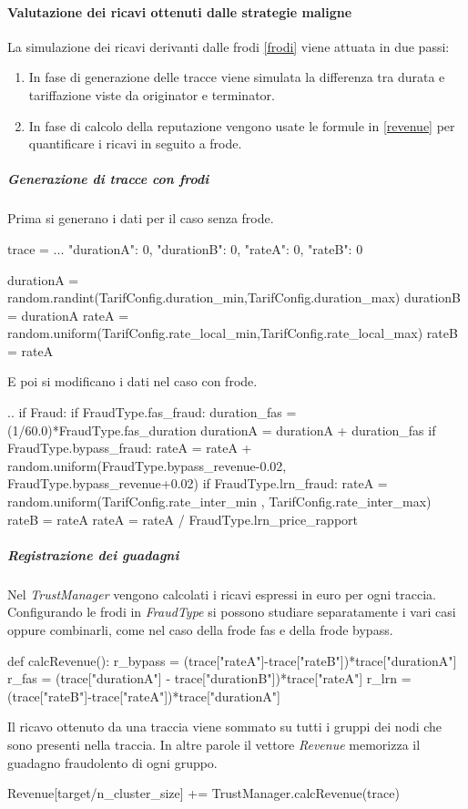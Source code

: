 \paragraph{Valutazione dei ricavi ottenuti dalle strategie maligne}

La simulazione dei ricavi derivanti dalle frodi \ref{frodi} viene attuata in due passi:
\begin{enumerate}
\item In fase di generazione delle tracce viene simulata la differenza tra durata e tariffazione viste da originator e terminator.
\item In fase di calcolo della reputazione vengono usate le formule in \ref{revenue} per quantificare i ricavi in seguito a frode.
\end{enumerate}
\subparagraph{Generazione di tracce con frodi}
Prima si generano i dati per  il caso senza frode.
\begin{python}
trace = {
	...
	"durationA": 0,
	"durationB": 0,
	"rateA": 0,
	"rateB": 0
}

durationA = random.randint(TarifConfig.duration_min,TarifConfig.duration_max)
durationB = durationA
rateA = random.uniform(TarifConfig.rate_local_min,TarifConfig.rate_local_max)
rateB = rateA
\end{python}

E poi si modificano i dati nel caso con frode. 
\begin{python}
..
if Fraud:
	if FraudType.fas_fraud:
		duration_fas = (1/60.0)*FraudType.fas_duration
		durationA = durationA + duration_fas
	if FraudType.bypass_fraud:
		rateA = rateA + random.uniform(FraudType.bypass_revenue-0.02, FraudType.bypass_revenue+0.02)
	if FraudType.lrn_fraud:
		rateA = random.uniform(TarifConfig.rate_inter_min , TarifConfig.rate_inter_max)
		rateB = rateA
		rateA = rateA / FraudType.lrn_price_rapport
\end{python}

\subparagraph{Registrazione dei guadagni}
Nel \emph{TrustManager} vengono calcolati i ricavi espressi in euro per ogni traccia. Configurando le frodi  in \emph{FraudType} si possono studiare separatamente i vari casi oppure combinarli, come nel caso della frode fas e della frode bypass.
\begin{python}
def calcRevenue():
	r_bypass = (trace["rateA"]-trace["rateB"])*trace["durationA"]
	r_fas = (trace["durationA"] - trace["durationB"])*trace["rateA"]
	r_lrn = (trace["rateB"]-trace["rateA"])*trace["durationA"]
\end{python}
Il ricavo ottenuto da una traccia viene sommato su tutti i gruppi dei nodi che sono presenti nella traccia. In altre parole il vettore \emph{Revenue} memorizza il guadagno fraudolento di ogni gruppo. 
\begin{python}
Revenue[target/n_cluster_size] += TrustManager.calcRevenue(trace)
\end{python}



